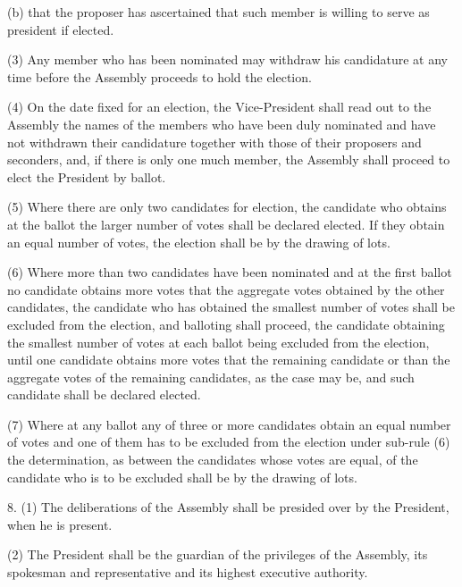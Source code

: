 (b) that the proposer has ascertained that such member is willing to serve as president if elected.



(3) Any member who has been nominated may withdraw his candidature at any time before the Assembly proceeds to hold the election.



(4) On the date fixed for an election, the Vice-President shall read out to the Assembly the names of the members who have been duly nominated and have not withdrawn their candidature together with those of their proposers and seconders, and, if there is only one much member, the Assembly shall proceed to elect the President by ballot.



(5) Where there are only two candidates for election, the candidate who obtains at the ballot the larger number of votes shall be declared elected. If they obtain an equal number of votes, the election shall be by the drawing of lots.



 (6) Where more than two candidates have been nominated and at the first ballot no candidate obtains more votes that the aggregate votes obtained by the other candidates, the candidate who has obtained the smallest number of votes shall be excluded from the election, and balloting shall proceed, the candidate obtaining the smallest number of votes at each ballot being excluded from the election, until one candidate obtains more votes that the remaining candidate or than the aggregate votes of the remaining candidates, as the case may be, and such candidate shall be declared elected.



(7) Where at any ballot any of three or more candidates obtain an equal number of votes and one of them has to be excluded from the election under sub-rule (6) the determination, as between the candidates whose votes are equal, of the candidate who is to be excluded shall be by the drawing of lots.



8. (1) The deliberations of the Assembly shall be presided over by the President, when he is present.



(2) The President shall be the guardian of the privileges of the Assembly, its spokesman and representative and its highest executive authority.



